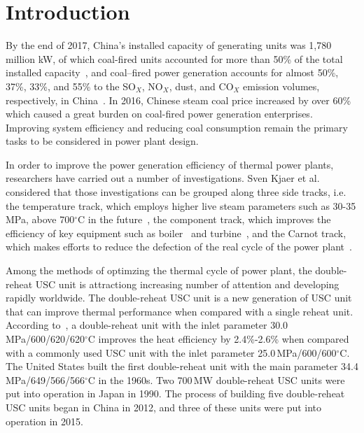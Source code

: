 \documentclass[preprint,12pt]{elsarticle}
\begin{document}
\begin{multicols}{2}
\printnomenclature[1.5cm]{}
\end{multicols}



\section{Introduction}
\label{sec1:intro}

By the end of 2017, China's installed capacity of generating units was 1,780 million kW, of which coal-fired units accounted for more than 50\% of the total installed capacity~\cite{2018}, and coal–fired power generation accounts for almost 50\%, 37\%, 33\%, and 55\% to the SO$_X$, NO$_X$, dust, and CO$_X$ emission volumes, respectively, in China~\cite{Zhang2010Analysis}.
In 2016, Chinese steam coal price increased by over 60\%~\cite{2017} which caused a great burden on coal-fired power generation enterprises. 
Improving system efficiency and reducing coal consumption remain the primary tasks to be considered in power plant design. 
 
In order to improve the power generation efficiency of thermal power plants, researchers have carried out a number of investigations.
Sven Kjaer et al.~\cite{Kjaer2010A} considered that those investigations can be grouped along three side tracks, i.e. the temperature track, which employs higher live steam parameters such as 30-35 MPa, above 700$^\circ$C in the future~\cite{Bugge2014High}, the component track, which improves the efficiency of key equipment such as boiler~\cite{Rosen2008Improving} and turbine~\cite{Zhang2016Optimization}, and the Carnot track, which makes efforts to reduce the defection of the real cycle of the power plant~\cite{Liu2018}.

Among the methods of optimzing the thermal cycle of power plant, the double-reheat USC unit is attractiong increasing number of attention and developing rapidly worldwide. 
The double-reheat USC unit is a new generation of USC unit that can improve thermal performance when compared with a single reheat unit. 
According to~\cite{Zhao2017Exergy}, a double-reheat unit with the inlet parameter 30.0\,MPa/600/620/620$^\circ$C improves the heat efficiency by 2.4\%-2.6\% when compared with a commonly used USC unit with the inlet parameter 25.0\,MPa/600/600$^\circ$C.
The United States built the first double-reheat unit with the main parameter 34.4 MPa/649/566/566$^\circ$C in the 1960s.
Two 700\,MW double-reheat USC units were put into operation in Japan in 1990. 
The process of building five double-reheat USC units began in China in 2012, and three of these units were put into operation in 2015.
\end{document}

